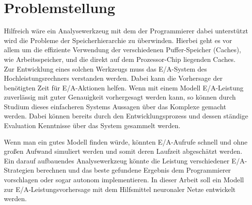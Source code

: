 \documentclass[
	12pt,
	a4paper,
	BCOR10mm,
	DIV14,
	listof=totoc,
	bibliography=totoc,
	headsepline
]{scrreprt}
\begin{document}
\section{Problemstellung}
Hilfreich wäre ein Analysewerkzeug mit dem der Programmierer dabei unterstützt wird die Probleme der Speicherhierarchie zu überwinden.
Hierbei geht es vor allem um die effiziente Verwendung der verschiedenen Puffer-Speicher (Caches), wie Arbeitsspeicher, und die direkt auf dem Prozessor-Chip liegenden Caches. 
Zur Entwicklung eines solchen Werkzeugs muss das E/A-System des Hochleistungsrechners verstanden werden.
Dabei kann die Vorhersage der benötigten Zeit für E/A-Aktionen helfen. Wenn mit einem Modell E/A-Leistung zuverlässig mit guter Genauigkeit vorhergesagt werden kann, so können durch Studium dieses einfacheren Systems Aussagen über das Komplexe gemacht werden.
Dabei können bereits durch den Entwicklungsprozess und dessen ständige Evaluation Kenntnisse über das System gesammelt werden.
  
Wenn man ein gutes Modell finden würde, könnten E/A-Aufrufe schnell und ohne großen Aufwand simuliert werden und somit deren Laufzeit abgeschätzt werden.
Ein darauf aufbauendes Analysewerkzeug könnte die Leistung verschiedener E/A-Strategien berechnen und das beste gefundene Ergebnis dem Programmierer vorschlagen oder sogar autonom implementieren.  
In dieser Arbeit soll ein Modell zur E/A-Leistungsvorhersage mit dem Hilfsmittel neuronaler Netze entwickelt werden. 
\end{document}
